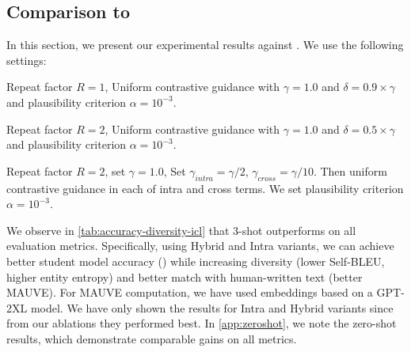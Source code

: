 \subsection{Comparison to \fewgen}
\label{sec:corrsyn_results}
In this section, we present our experimental results against \fewgen. We use the following settings:

 Repeat factor $R=1$, Uniform contrastive guidance with \mbox{$\gamma=1.0 $} and $\delta=0.9\times\gamma$ and plausibility criterion $\alpha=10^{-3}$.

 Repeat factor $R=2$, Uniform contrastive guidance with \mbox{$\gamma=1.0 $} and $\delta=0.5\times\gamma$ and plausibility criterion $\alpha=10^{-3}$.

 Repeat factor $R=2$, set $\gamma=1.0$, Set $\gamma_{intra}=\gamma/2$, $\gamma_{cross}=\gamma/10$. Then uniform contrastive guidance in each of intra and cross terms. We set plausibility criterion \mbox{$\alpha=10^{-3}$}.


We observe in \autoref{tab:accuracy-diversity-icl} that 3-shot \corrsyn{} outperforms \fewgen{} on all evaluation metrics. Specifically, using Hybrid and Intra variants, we can achieve better student model accuracy (\DistilBERT) while increasing diversity (lower Self-BLEU, higher entity entropy) and better match with human-written text (better MAUVE). For MAUVE computation, we have used embeddings based on a GPT-2XL model. We have only shown the results for Intra and Hybrid variants since from our ablations they performed best. In \autoref{app:zeroshot}, we note the zero-shot results, which demonstrate comparable gains on all metrics. 





